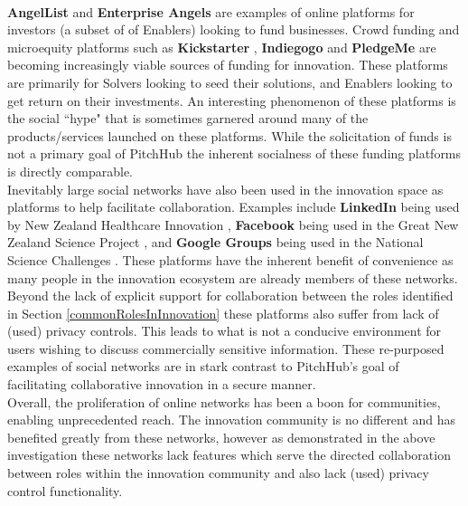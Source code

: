 \\
\newline
\textbf{AngelList} \cite{Angel:online} and \textbf{Enterprise Angels} \cite{enterpriseAngles:online} are examples of online platforms for investors (a subset of of Enablers) looking to fund businesses. Crowd funding and microequity platforms such as \textbf{Kickstarter} \cite{Kicks6:online}, \textbf{Indiegogo} \cite{Indie3:online} and \textbf{PledgeMe} \cite{Pledge:online} are becoming increasingly viable sources of funding for innovation. These platforms are primarily for Solvers looking to seed their solutions, and Enablers looking to get return on their investments. An interesting phenomenon of these platforms is the social ``hype" that is sometimes garnered around many of the products/services launched on these platforms. While the solicitation of funds is not a primary goal of PitchHub the inherent socialness of these funding platforms is directly comparable.
\\
\newline
Inevitably large social networks have also been used in the innovation space as platforms to help facilitate collaboration. Examples include \textbf{LinkedIn} \cite{Linkedin:online} being used by New Zealand Healthcare Innovation \cite{nzHealthCare:online}, \textbf{Facebook} \cite{Faceb6:online} being used in the Great New Zealand Science Project \cite{greatNZScience:online}, and \textbf{Google Groups} \cite{Googlegroups:online} being used in the National Science Challenges \cite{nzNSC10:online}. These platforms have the inherent benefit of convenience as many people in the innovation ecosystem are already members of these networks. Beyond the lack of explicit support for collaboration between the roles identified in Section \ref{commonRolesInInnovation} these platforms also suffer from lack of (used) privacy controls. This leads to what is not a conducive environment for users wishing to discuss commercially sensitive information. These re-purposed examples of social networks are in stark contrast to PitchHub's goal of facilitating collaborative innovation in a secure manner.
\\
\newline
Overall, the proliferation of online networks has been a boon for communities, enabling unprecedented reach. The innovation community is no different and has benefited greatly from these networks, however as demonstrated in the above investigation these networks lack features which serve the directed collaboration between roles within the innovation community and also lack (used) privacy control functionality.

